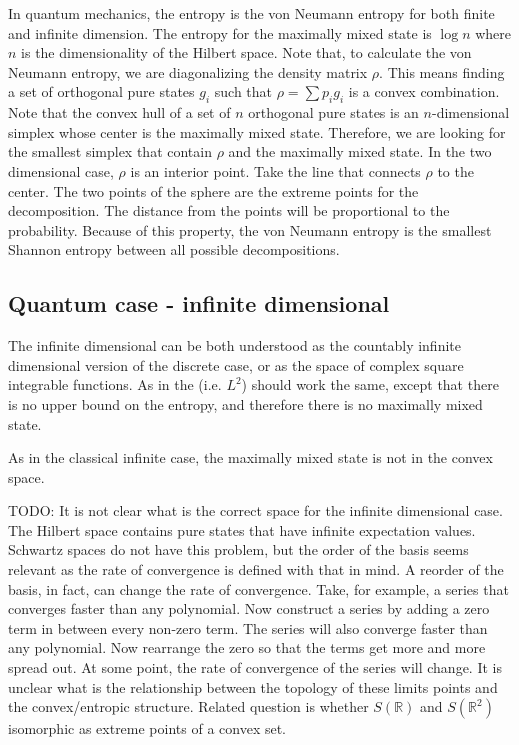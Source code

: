 In quantum mechanics, the entropy is the von Neumann entropy for both finite and infinite dimension. The entropy for the maximally mixed state is $\log n$ where $n$ is the dimensionality of the Hilbert space. Note that, to calculate the von Neumann entropy, we are diagonalizing the density matrix $\rho$. This means finding a set of orthogonal pure states $g_i$ such that $\rho = \sum p_i g_i$ is a convex combination. Note that the convex hull of a set of $n$ orthogonal pure states is an $n$-dimensional simplex whose center is the maximally mixed state. Therefore, we are looking for the smallest simplex that contain $\rho$ and the maximally mixed state. In the two dimensional case, $\rho$ is an interior point. Take the line that connects $\rho$ to the center. The two points of the sphere are the extreme points for the decomposition. The distance from the points will be proportional to the probability. Because of this property, the von Neumann entropy is the smallest Shannon entropy between all possible decompositions.


\subsection{Quantum case - infinite dimensional}

The infinite dimensional can be both understood as the countably infinite dimensional version of the discrete case, or as the space of complex square integrable functions. As in the  (i.e. $L^2$) should work the same, except that there is no upper bound on the entropy, and therefore there is no maximally mixed state.

As in the classical infinite case, the maximally mixed state is not in the convex space.

TODO: It is not clear what is the correct space for the infinite dimensional case. The Hilbert space contains pure states that have infinite expectation values. Schwartz spaces do not have this problem, but the order of the basis seems relevant as the rate of convergence is defined with that in mind. A reorder of the basis, in fact, can change the rate of convergence. Take, for example, a series that converges faster than any polynomial. Now construct a series by adding a zero term in between every non-zero term. The series will also converge faster than any polynomial. Now rearrange the zero so that the terms get more and more spread out. At some point, the rate of convergence of the series will change. It is unclear what is the relationship between the topology of these limits points and the convex/entropic structure. Related question is whether $S(\mathbb{R})$ and $S(\mathbb{R}^2)$ isomorphic as extreme points of a convex set.

